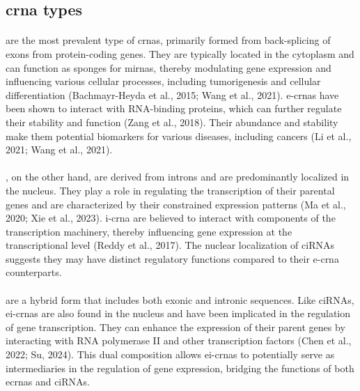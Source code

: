 \subsection{\gls{crna} types}
\label{sec:circrna_types}

\paragraph{} are the most prevalent type of
\glspl{crna}, primarily formed from back-splicing of exons from protein-coding
genes.
They are typically located in the cytoplasm and can function as sponges for
\glspl{mirna}, thereby modulating gene expression and influencing various
cellular processes, including tumorigenesis and cellular differentiation
(Bachmayr-Heyda et al., 2015; Wang et al., 2021).
\glspl{e-crna} have been shown to interact with RNA-binding proteins, which can
further regulate their stability and function (Zang et al., 2018).
Their abundance and stability make them potential biomarkers for various
diseases, including cancers (Li et al., 2021; Wang et al., 2021).

\paragraph{}, on the other hand, are derived
from introns
and are predominantly localized in the nucleus.
They play a role in regulating the transcription of their parental genes and
are characterized by their constrained expression patterns (Ma et al., 2020;
Xie et al., 2023).
\gls{i-crna} are
believed to interact with components of the transcription machinery, thereby
influencing gene expression at the transcriptional level (Reddy et al., 2017).
The nuclear localization of ciRNAs suggests they may have distinct regulatory
functions compared to their \gls{e-crna} counterparts.

\paragraph{} are a hybrid form that
includes both
exonic and intronic sequences.
Like ciRNAs, \glspl{ei-crna} are also found in the nucleus and have been
implicated in the regulation of gene transcription.
They can enhance the expression of their parent genes by interacting with RNA
polymerase II and other transcription factors (Chen et al., 2022; Su, 2024).
This dual composition allows \glspl{ei-crna} to potentially serve as
intermediaries in the regulation of gene expression, bridging the functions of
both e\glspl{crna} and ciRNAs.

